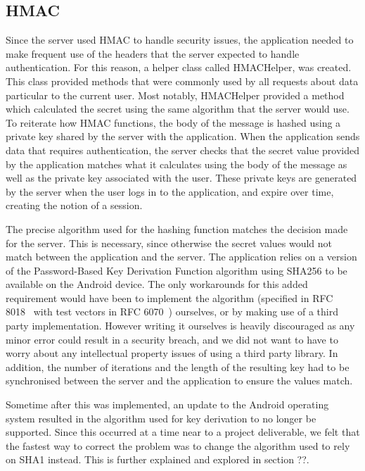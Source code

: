 \documentclass[12pt]{report}
\let\Oldsubsection\subsection
\renewcommand{\subsection}{\FloatBarrier\Oldsubsection}
\begin{document}
\subsection{HMAC} \label{hmac}

Since the server used HMAC to handle security issues, the application needed to make frequent use of the headers that
the server expected to handle authentication. For this reason, a helper class called HMACHelper, was created. This
class provided methods that were commonly used by all requests about data particular to the current user. Most notably,
HMACHelper provided a method which calculated the secret using the same algorithm that the server would use. To
reiterate how HMAC functions, the body of the message is hashed using a private key shared by the server with the
application. When the application sends data that requires authentication, the server checks that the secret value
provided by the application matches what it calculates using the body of the message as well as the private key
associated with the user. These private keys are generated by the server when the user logs in to the application,
and expire over time, creating the notion of a session.

The precise algorithm used for the hashing function matches the decision made for the server. This is necessary, since
otherwise the secret values would not match between the application and the server. The application relies on a version
of the Password-Based Key Derivation Function algorithm using SHA256 to be available on the Android device. The only
workarounds for this added requirement would have been to implement the algorithm (specified in RFC 8018~\autocite{RFC8018} with test
vectors in RFC 6070~\autocite{RFC6070}) ourselves, or by making use of a third party implementation. However writing it ourselves is
heavily discouraged as any minor error could result in a security breach, and we did not want to have to worry about
any intellectual property issues of using a third party library. In addition, the number of iterations and the length of
the resulting key had to be synchronised between the server and the application to ensure the values match.

Sometime after this was implemented, an update to the Android operating system resulted in the algorithm used for key
derivation to no longer be supported. Since this occurred at a time near to a project deliverable, we felt that the
fastest way to correct the problem was to change the algorithm used to rely on SHA1 instead. This is further explained
and explored in section ??.
\end{document}
